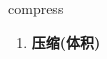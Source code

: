 
\begin{frame}
{\huge compress}
\begin{center}
\begin{enumerate}\Large
  \item \textbf{压缩(体积)}
\end{enumerate}
\end{center}
\end{frame}
